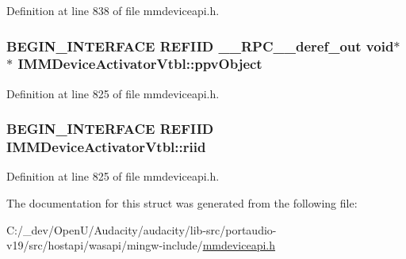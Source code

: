Definition at line 838 of file mmdeviceapi.\+h.

\subsubsection[{\texorpdfstring{ppv\+Object}{ppvObject}}]{\setlength{\rightskip}{0pt plus 5cm}B\+E\+G\+I\+N\+\_\+\+I\+N\+T\+E\+R\+F\+A\+CE {\bf R\+E\+F\+I\+ID} {\bf \+\_\+\+\_\+\+R\+P\+C\+\_\+\+\_\+deref\+\_\+out} {\bf void}$\ast$$\ast$ I\+M\+M\+Device\+Activator\+Vtbl\+::ppv\+Object}\hypertarget{struct_i_m_m_device_activator_vtbl_a031cd3b4b0c0bfe1ea0f7eaee3d18835}{}\label{struct_i_m_m_device_activator_vtbl_a031cd3b4b0c0bfe1ea0f7eaee3d18835}


Definition at line 825 of file mmdeviceapi.\+h.

\subsubsection[{\texorpdfstring{riid}{riid}}]{\setlength{\rightskip}{0pt plus 5cm}B\+E\+G\+I\+N\+\_\+\+I\+N\+T\+E\+R\+F\+A\+CE {\bf R\+E\+F\+I\+ID} I\+M\+M\+Device\+Activator\+Vtbl\+::riid}\hypertarget{struct_i_m_m_device_activator_vtbl_ae20670664252ee3a0bf2ba7c93cd5da4}{}\label{struct_i_m_m_device_activator_vtbl_ae20670664252ee3a0bf2ba7c93cd5da4}


Definition at line 825 of file mmdeviceapi.\+h.



The documentation for this struct was generated from the following file\+:\begin{DoxyCompactItemize}
\item 
C\+:/\+\_\+dev/\+Open\+U/\+Audacity/audacity/lib-\/src/portaudio-\/v19/src/hostapi/wasapi/mingw-\/include/\hyperlink{mmdeviceapi_8h}{mmdeviceapi.\+h}\end{DoxyCompactItemize}
